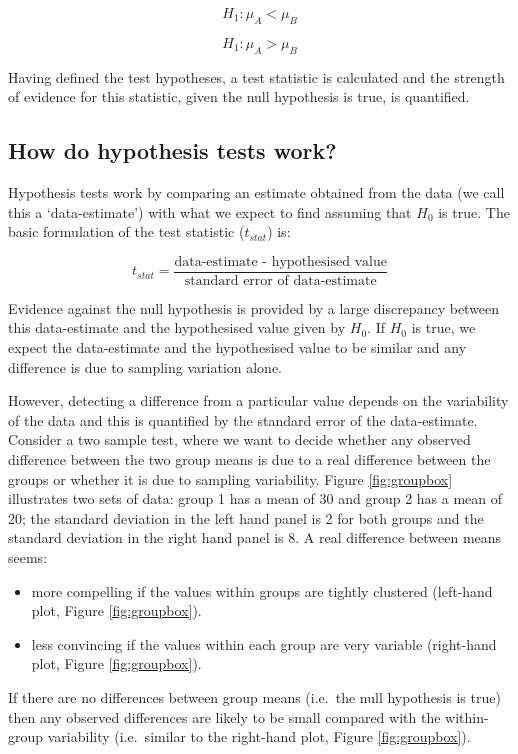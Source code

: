 \documentclass[
  oneside]{krantz}
\begin{document}
\[H_1: \mu_A < \mu_B\]

\[H_1: \mu_A > \mu_B\]

Having defined the test hypotheses, a test statistic is calculated and the strength of evidence for this statistic, given the null hypothesis is true, is quantified.

\hypertarget{how-do-hypothesis-tests-work}{%
\subsection{How do hypothesis tests work?}\label{how-do-hypothesis-tests-work}}

Hypothesis tests work by comparing an estimate obtained from the data (we call this a `data-estimate') with what we expect to find assuming that \(H_0\) is true. The basic formulation of the test statistic (\(t_{stat}\)) is:

\[t_{stat}=\frac{\textrm{data-estimate - hypothesised value}}{\textrm{standard error of data-estimate}}\]

Evidence against the null hypothesis is provided by a large discrepancy between this data-estimate and the hypothesised value given by \(H_0\). If \(H_0\) is true, we expect the data-estimate and the hypothesised value to be similar and any difference is due to sampling variation alone.

However, detecting a difference from a particular value depends on the variability of the data and this is quantified by the standard error of the data-estimate. Consider a two sample test, where we want to decide whether any observed difference between the two group means is due to a real difference between the groups or whether it is due to sampling variability. Figure \ref{fig:groupbox} illustrates two sets of data: group 1 has a mean of 30 and group 2 has a mean of 20; the standard deviation in the left hand panel is 2 for both groups and the standard deviation in the right hand panel is 8. A real difference between means seems:

\begin{itemize}
\item
  more compelling if the values within groups are tightly clustered (left-hand plot, Figure \ref{fig:groupbox}).
\item
  less convincing if the values within each group are very variable (right-hand plot, Figure \ref{fig:groupbox}).
\end{itemize}

If there are no differences between group means (i.e.~the null hypothesis is true) then any observed differences are likely to be small compared with the within-group variability (i.e.~similar to the right-hand plot, Figure \ref{fig:groupbox}).
\end{document}
